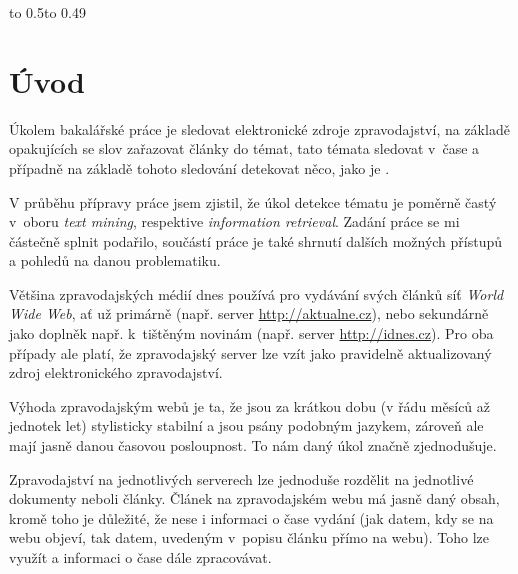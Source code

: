 \documentclass[12pt,a4paper]{report}
\let\openright=\clearpage
\begin{document}
\vbox to 0.5\vsize{
\setlength\parindent{0mm}
\setlength\parskip{5mm}

\kecycz{}

\vss}\nobreak\vbox to 0.49\vsize{
\setlength\parindent{0mm}
\setlength\parskip{5mm}

\kecyen{}

\vss}




\newpage


\openright
\pagestyle{plain}
\setcounter{page}{1}
\tableofcontents

\chapter{Úvod}

Úkolem bakalářské práce je sledovat elektronické zdroje zpravodajství, na zá\-klad\-ě opakujících se slov zařazovat články do témat, tato témata sledovat v~čase a případně na základě tohoto sledování detekovat něco, jako je .

V průběhu přípravy práce jsem zjistil, že úkol detekce tématu je poměrně častý v~oboru \emph{text mining}, respektive \emph{information retrieval}. Zadání práce se mi částečně splnit podařilo, součástí práce je také shrnutí dalších možných přístupů a pohledů na danou problematiku.

Většina zpravodajských médií dnes používá pro vydávání svých článků síť \emph{World Wide Web}, ať už primárně (např. server \url{http://aktualne.cz}), nebo sekundárně jako doplněk např. k~tištěným novinám (např. server \url{http://idnes.cz}). Pro oba případy ale platí, že zpravodajský server lze vzít jako pravidelně aktualizovaný zdroj elektronického zpravodajství.

Výhoda zpravodajským webů je ta, že jsou za krátkou dobu (v řádu měsíců až jednotek let) stylisticky stabilní a jsou psány podobným jazykem, zároveň ale mají jasně danou časovou posloupnost. To nám daný úkol značně zjednodušuje.

Zpravodajství na jednotlivých serverech lze jednoduše rozdělit na jednotlivé dokumenty neboli články. Článek na zpravodajském webu má jasně daný obsah, kromě toho je důležité, že nese i informaci o čase vydání (jak datem, kdy se na webu objeví, tak datem, uvedeným v~popisu článku přímo na webu). Toho lze využít a informaci o čase dále zpracovávat.
\end{document}
